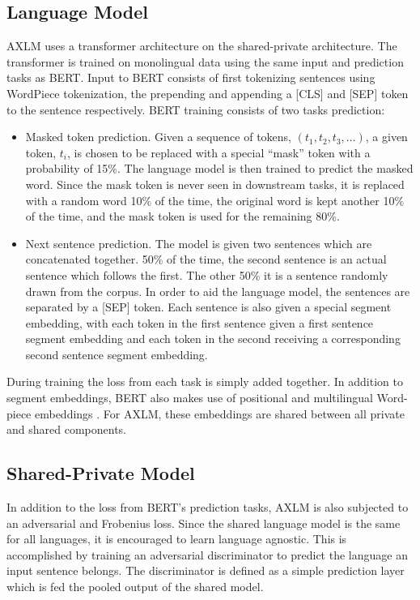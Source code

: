 \documentclass[10pt,letterpaper,twocolumn]{article}
\begin{document}

\subsection{Language Model}
AXLM uses a transformer architecture on the shared-private architecture.  The transformer is trained on monolingual data using the same input and prediction tasks as BERT.  Input to BERT consists of first tokenizing sentences using WordPiece tokenization, the prepending and appending a [CLS] and [SEP] token to the sentence respectively.  BERT training consists of two tasks prediction:

\begin{itemize}
	\item Masked token prediction.  Given a sequence of tokens, $(t_1, t_2, t_3, \dots)$, a given token, $t_i$, is chosen to be replaced with a special ``mask'' token with a probability of 15\%.  The language model is then trained to predict the masked word.  Since the mask token is never seen in downstream tasks, it is replaced with a random word 10\% of the time, the original word is kept another 10\% of the time, and the mask token is used for the remaining 80\%.

	\item Next sentence prediction.  The model is given two sentences which are concatenated together.  50\% of the time, the second sentence is an actual sentence which follows the first.  The other 50\% it is a sentence randomly drawn from the corpus.  In order to aid the language model, the sentences are separated by a [SEP] token.  Each sentence is also given a special segment embedding, with each token in the first sentence given a first sentence segment embedding and each token in the second receiving a corresponding second sentence segment embedding.
\end{itemize}

During training the loss from each task is simply added together.  In addition to segment embeddings, BERT also makes use of positional and multilingual Word-piece embeddings \cite{}.  For AXLM, these embeddings are shared between all private and shared components.


\subsection{Shared-Private Model}
In addition to the loss from BERT's prediction tasks, AXLM is also subjected to an adversarial and Frobenius loss.  Since the shared language model is the same for all languages, it is encouraged to learn language agnostic.  This is accomplished by training an adversarial discriminator to predict the language an input sentence belongs.  The discriminator is defined as a simple prediction layer which is fed the pooled output of the shared model.
\end{document}
